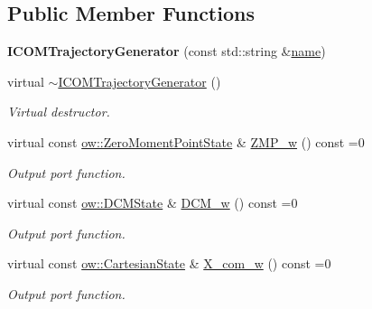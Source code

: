 \subsection*{Public Member Functions}
\begin{DoxyCompactItemize}
\item 
{\bfseries I\+C\+O\+M\+Trajectory\+Generator} (const std\+::string \&\hyperlink{classow_1_1GenericModuleBase_a4b712883728cdbab7779e27f9a23689c}{name})\hypertarget{classow_1_1ICOMTrajectoryGenerator_a2fc5361a08d6d2e27f04a3539ed68965}{}\label{classow_1_1ICOMTrajectoryGenerator_a2fc5361a08d6d2e27f04a3539ed68965}

\item 
virtual \hyperlink{classow_1_1ICOMTrajectoryGenerator_ac018f29d8a184fe06903dc8a220b416c}{$\sim$\+I\+C\+O\+M\+Trajectory\+Generator} ()\hypertarget{classow_1_1ICOMTrajectoryGenerator_ac018f29d8a184fe06903dc8a220b416c}{}\label{classow_1_1ICOMTrajectoryGenerator_ac018f29d8a184fe06903dc8a220b416c}

\begin{DoxyCompactList}\small\item\em Virtual destructor. \end{DoxyCompactList}\item 
virtual const \hyperlink{classow__core_1_1ZeroMomentPointState}{ow\+::\+Zero\+Moment\+Point\+State} \& \hyperlink{classow_1_1ICOMTrajectoryGenerator_a45f42b461f2377055071338ef719aa50}{Z\+M\+P\+\_\+w} () const =0
\begin{DoxyCompactList}\small\item\em Output port function. \end{DoxyCompactList}\item 
virtual const \hyperlink{classow__core_1_1DivergentComponentOfMotionState}{ow\+::\+D\+C\+M\+State} \& \hyperlink{classow_1_1ICOMTrajectoryGenerator_aaca7b9f4233b9e2e44a586af52e9305d}{D\+C\+M\+\_\+w} () const =0
\begin{DoxyCompactList}\small\item\em Output port function. \end{DoxyCompactList}\item 
virtual const \hyperlink{classow__core_1_1CartesianState}{ow\+::\+Cartesian\+State} \& \hyperlink{classow_1_1ICOMTrajectoryGenerator_aa48c8eb75d6a9ff8752deb2df6aecb01}{X\+\_\+com\+\_\+w} () const =0
\begin{DoxyCompactList}\small\item\em Output port function. \end{DoxyCompactList}\end{DoxyCompactItemize}
